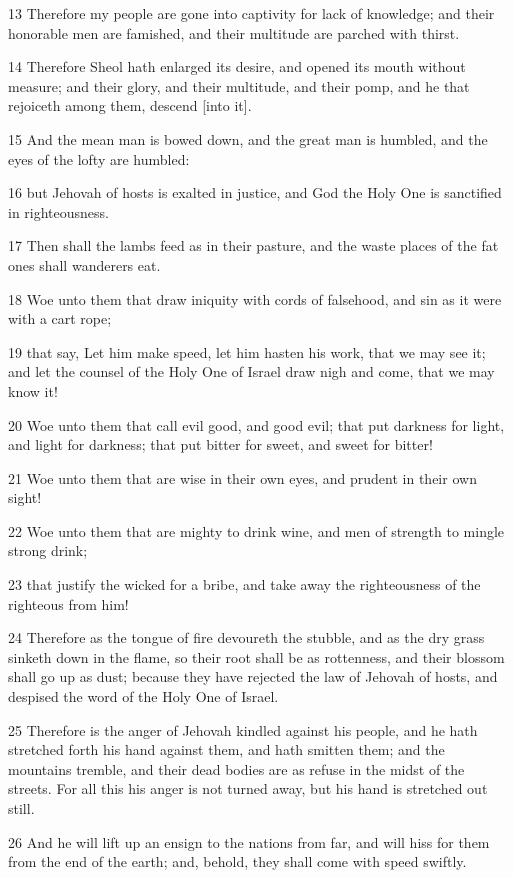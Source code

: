 \par 13 Therefore my people are gone into captivity for lack of knowledge; and their honorable men are famished, and their multitude are parched with thirst.
\par 14 Therefore Sheol hath enlarged its desire, and opened its mouth without measure; and their glory, and their multitude, and their pomp, and he that rejoiceth among them, descend [into it].
\par 15 And the mean man is bowed down, and the great man is humbled, and the eyes of the lofty are humbled:
\par 16 but Jehovah of hosts is exalted in justice, and God the Holy One is sanctified in righteousness.
\par 17 Then shall the lambs feed as in their pasture, and the waste places of the fat ones shall wanderers eat.
\par 18 Woe unto them that draw iniquity with cords of falsehood, and sin as it were with a cart rope;
\par 19 that say, Let him make speed, let him hasten his work, that we may see it; and let the counsel of the Holy One of Israel draw nigh and come, that we may know it!
\par 20 Woe unto them that call evil good, and good evil; that put darkness for light, and light for darkness; that put bitter for sweet, and sweet for bitter!
\par 21 Woe unto them that are wise in their own eyes, and prudent in their own sight!
\par 22 Woe unto them that are mighty to drink wine, and men of strength to mingle strong drink;
\par 23 that justify the wicked for a bribe, and take away the righteousness of the righteous from him!
\par 24 Therefore as the tongue of fire devoureth the stubble, and as the dry grass sinketh down in the flame, so their root shall be as rottenness, and their blossom shall go up as dust; because they have rejected the law of Jehovah of hosts, and despised the word of the Holy One of Israel.
\par 25 Therefore is the anger of Jehovah kindled against his people, and he hath stretched forth his hand against them, and hath smitten them; and the mountains tremble, and their dead bodies are as refuse in the midst of the streets. For all this his anger is not turned away, but his hand is stretched out still.
\par 26 And he will lift up an ensign to the nations from far, and will hiss for them from the end of the earth; and, behold, they shall come with speed swiftly.
